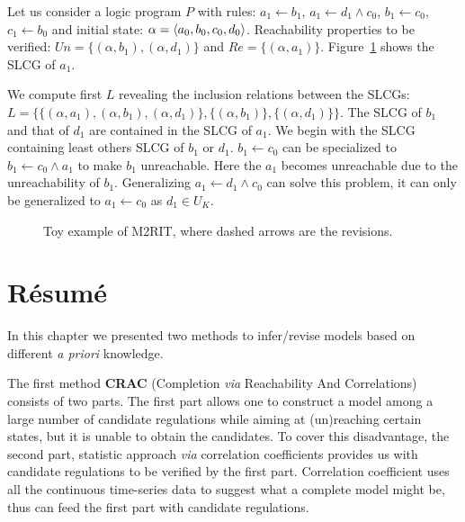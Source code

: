 \begin{example}
Let us consider a logic program $P$ with rules: $a_1\gets b_1$, $a_1\gets d_1 \land c_0$, $b_1\gets c_0$, $c_1\gets b_0$ and initial state: $\alpha=\langle a_0,b_0,c_0,d_0\rangle$.
Reachability properties to be verified: $Un=\{(\alpha,b_1),(\alpha,d_1)\}$ and $Re=\{(\alpha,a_1)\}$.
Figure~\ref{fig:toyExampleM2RIT} shows the SLCG of $a_1$.

We compute first $L$ revealing the inclusion relations between the SLCGs: $L=\{\{(\alpha,a_1),(\alpha,b_1),(\alpha,d_1)\},\{(\alpha,b_1)\},\{(\alpha,d_1)\}\}$.
The SLCG of $b_1$ and that of $d_1$ are contained in the SLCG of $a_1$.
We begin with the SLCG containing least others SLCG of $b_1$ or $d_1$.
$b_1\gets c_0$ can be specialized to $b_1\gets c_0\land a_1$ to make $b_1$ unreachable.
Here the $a_1$ becomes unreachable due to the unreachability of $b_1$.
Generalizing $a_1\gets d_1 \land c_0$ can solve this problem, it can only be generalized to $a_1 \gets c_0$ as $d_1\in U_K$.
\end{example}
    \begin{figure}[ht]
        \centering
        
        \caption[Toy example of M2RIT]{Toy example of M2RIT, where dashed arrows are the revisions.}
        \label{fig:toyExampleM2RIT}
    \end{figure}
\section{R\'esum\'e}
In this chapter we presented two methods to infer/revise models based on different \textit{a priori} knowledge.

The first method \textbf{CRAC} (Completion \textit{via} Reachability And Correlations) consists of two parts.
The first part allows one to construct a model among a large number of candidate regulations while aiming at (un)reaching certain states, but it is unable to obtain the candidates.
To cover this disadvantage, the second part, statistic approach \textit{via} correlation coefficients provides us with candidate regulations to be verified by the first part.
Correlation coefficient uses all the continuous time-series data to suggest what a complete model might be, thus can feed the first part with candidate regulations.


